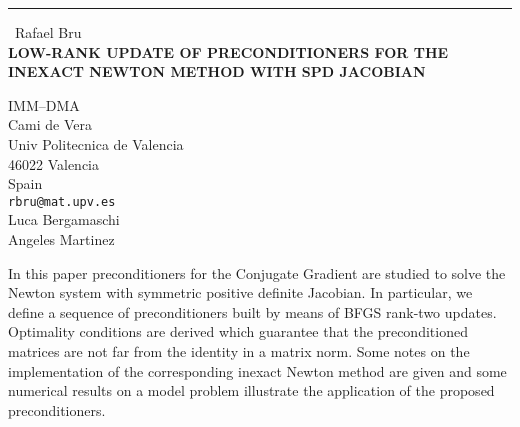 \documentclass{report}
\begin{document}
\begin{center}
\rule{6in}{1pt} \
{\large Rafael Bru \\
{\bf LOW-RANK UPDATE OF PRECONDITIONERS FOR THE INEXACT NEWTON METHOD WITH SPD JACOBIAN}}

IMM--DMA \\ Cami de Vera \\ Univ Politecnica de Valencia \\ 46022 Valencia \\ Spain
\\
{\tt rbru@mat.upv.es}\\
Luca Bergamaschi\\
Angeles Martinez\end{center}

In this paper preconditioners for the Conjugate Gradient are studied to
solve the Newton system with symmetric positive definite Jacobian. In
particular, we define a sequence of preconditioners built by means of
BFGS rank-two updates. Optimality conditions are derived which guarantee
that the preconditioned matrices are not far from the identity in a
matrix norm. Some notes on the implementation of the
corresponding inexact Newton method are given and some numerical results
on a model problem illustrate the application of the proposed
preconditioners.
\end{document}
